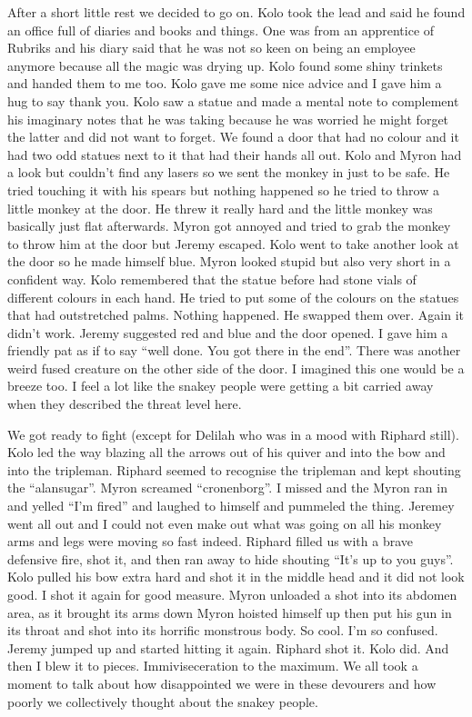 After a short little rest we decided to go on. Kolo took the lead and said he found an office full of diaries and books and things. One was from an apprentice of Rubriks and his diary said that he was not so keen on being an employee anymore because all the magic was drying up. Kolo found some shiny trinkets and handed them to me too. Kolo gave me some nice advice and I gave him a hug to say thank you. Kolo saw a statue and made a mental note to complement his imaginary notes that he was taking because he was worried he might forget the latter and did not want to forget. We found a door that had no colour and it had two odd statues next to it that had their hands all out. Kolo and Myron had a look but couldn’t find any lasers so we sent the monkey in just to be safe. He tried touching it with his spears but nothing happened so he tried to throw a little monkey at the door. He threw it really hard and the little monkey was basically just flat afterwards. Myron got annoyed and tried to grab the monkey to throw him at the door but Jeremy escaped. Kolo went to take another look at the door so he made himself blue. Myron looked stupid but also very short in a confident way. Kolo remembered that the statue before had stone vials of different colours in each hand. He tried to put some of the colours on the statues that had outstretched palms. Nothing happened. He swapped them over. Again it didn’t work. Jeremy suggested red and blue and the door opened. I gave him a friendly pat as if to say “well done. You got there in the end”. There was another weird fused creature on the other side of the door. I imagined this one would be a breeze too. I feel a lot like the snakey people were getting a bit carried away when they described the threat level here.\medskip

We got ready to fight (except for Delilah who was in a mood with Riphard still). Kolo led the way blazing all the arrows out of his quiver and into the bow and into the tripleman. Riphard seemed to recognise the tripleman and kept shouting the “alansugar”. Myron screamed “cronenborg”. I missed and the Myron ran in and yelled “I’m fired” and laughed to himself and pummeled the thing. Jeremey went all out and I could not even make out what was going on all his monkey arms and legs were moving so fast indeed. Riphard filled us with a brave defensive fire, shot it, and then ran away to hide shouting “It’s up to you guys”. Kolo pulled his bow extra hard and shot it in the middle head and it did not look good. I shot it again for good measure. Myron unloaded a shot into its abdomen area, as it brought its arms down Myron hoisted himself up then put his gun in its throat and shot into its horrific monstrous body. So cool. I’m so confused. Jeremy jumped up and started hitting it again. Riphard shot it. Kolo did. And then I blew it to pieces. Immiviseceration to the maximum. We all took a moment to talk about how disappointed we were in these devourers and how poorly we collectively thought about the snakey people.\medskip

